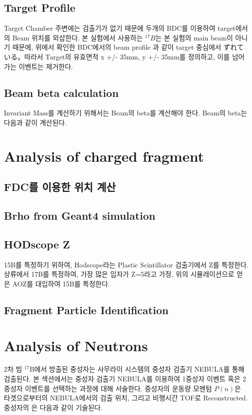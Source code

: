 \subsection{Target Profile}
Target Chamber 주변에는 검출기가 없기 때문에 두개의 BDC를 이용하여 target에서의 Beam 위치를 외삽한다. 본 실험에서 사용하는 ${}^{17}B$는 본 실험의 main beam이 아니기 때문에, 위에서 확인한 BDC에서의 beam profile 과 같이 target 중심에서 ずれている。따라서 Target의 유효면적 x +/- 35mm, y +/- 35mm를 정의하고, 이를 넘어가는 이벤트는 제거한다.

\subsection{Beam beta calculation}
Invariant Mass를 계산하기 위해서는 Beam의 beta를 계산해야 한다. Beam의 beta는 다음과 같이 계산된다.


\section{Analysis of charged fragment}
\subsection{FDC를 이용한 위치 계산}
\subsection{Brho from Geant4 simulation}
\subsection{HODscope Z}
15B를 특정하기 위하여, Hodscope라는 Plastic Scintillator 검출기에서 Z를 특정한다.
상류에서 17B를 특정하여, 가장 많은 입자가 Z=5라고 가정, 위의 시뮬레이션으로 얻은 AOZ를 대입하여 15B를 특정한다.
\subsection{Fragment Particle Identification}

\clearpage

\section{Analysis of Neutrons}
2차 빔 ${}^{17}$B에서 방출된 중성자는 사무라이 시스템의 중성자 검출기 NEBULA를 통해 검출된다. 본 섹션에서는 중성자 검출기 NEBULA를 이용하여 1중성자 이벤트 혹은 2중성자 이벤트를 선택하는 과정에 대해 서술한다. 중성자의 운동량 모멘텀 $P(n)$은 타겟으로부터의 NEBULA에서의 검출 위치, 그리고 비행시간 TOF로 Reconstructed. 중성자의 은 다음과 같이 기술된다.


